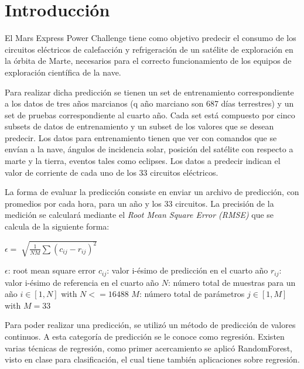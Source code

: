 \documentclass[../Main.tex]{subfiles}
\begin{document}
\section{Introducción}

El Mars Express Power Challenge tiene como objetivo predecir el consumo de los circuitos eléctricos de calefacción y refrigeración de un satélite de exploración en la órbita de Marte, necesarios para el correcto funcionamiento de los equipos de exploración científica de la nave.
\newline \par
Para realizar dicha predicción se tienen un set de entrenamiento correspondiente a los datos de tres años marcianos (q año marciano son 687 días terrestres) y un set de pruebas correspondiente al cuarto año.
Cada set está compuesto por cinco subsets de datos de entrenamiento y un subset de los valores que se desean predecir. Los datos para entrenamiento tienen que ver con comandos que se envían a la nave, ángulos de incidencia solar, posición del satélite con respecto a marte y la tierra, eventos tales como eclipses. Los datos a predecir indican el valor de corriente de cada uno de los 33 circuitos eléctricos. 
\newline \par
La forma de evaluar la predicción consiste en enviar un archivo de predicción, con promedios por cada hora, para un año y los 33 circuitos. La precisión de la medición se calculará mediante el \textit{Root Mean Square Error (RMSE)}  que se calcula de la siguiente forma:
\begin{center} 
$\epsilon = \sqrt[]{\frac{1}{NM}\sum{(c_{ij}-r_{ij})^{2}}}$ 
\end{center}
$\epsilon$: root mean square error \newline
$c_{ij}$: valor i-ésimo de predicción en el cuarto año\newline
$r_{ij}$: valor i-ésimo de referencia en el cuarto año \newline
$N$: número total de muestras para un año $i \in [1,N]$ with $N<=16488$ \newline
$M$: número total de parámetros $j \in [1,M]$ with  $M=33$ 
\newline \par
Para poder realizar una predicción, se utilizó un método de predicción de valores continuos. A esta categoría de predicción se le conoce como regresión. Existen varias técnicas de regresión, como primer acercamiento se aplicó RandomForest, visto en clase para clasificación, el cual tiene también aplicaciones sobre regresión.
\end{document}
